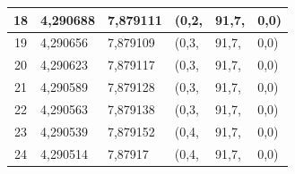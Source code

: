\begin{table}[!htb]
\begin{tabular}{|c|l|l|l|l|l|}
18                             & {\color[HTML]{000000} 4,290688}                                                                             & {\color[HTML]{000000} 7,879111}                                                                              & {\color[HTML]{000000} (0,2,}    & {\color[HTML]{000000} 91,7,}    & {\color[HTML]{000000} 0,0)}     \\ \hline
19                             & {\color[HTML]{000000} 4,290656}                                                                             & {\color[HTML]{000000} 7,879109}                                                                              & {\color[HTML]{000000} (0,3,}    & {\color[HTML]{000000} 91,7,}    & {\color[HTML]{000000} 0,0)}     \\ \hline
20                             & {\color[HTML]{000000} 4,290623}                                                                             & {\color[HTML]{000000} 7,879117}                                                                              & {\color[HTML]{000000} (0,3,}    & {\color[HTML]{000000} 91,7,}    & {\color[HTML]{000000} 0,0)}     \\ \hline
21                             & {\color[HTML]{000000} 4,290589}                                                                             & {\color[HTML]{000000} 7,879128}                                                                              & {\color[HTML]{000000} (0,3,}    & {\color[HTML]{000000} 91,7,}    & {\color[HTML]{000000} 0,0)}     \\ \hline
22                             & {\color[HTML]{000000} 4,290563}                                                                             & {\color[HTML]{000000} 7,879138}                                                                              & {\color[HTML]{000000} (0,3,}    & {\color[HTML]{000000} 91,7,}    & {\color[HTML]{000000} 0,0)}     \\ \hline
23                             & {\color[HTML]{000000} 4,290539}                                                                             & {\color[HTML]{000000} 7,879152}                                                                              & {\color[HTML]{000000} (0,4,}    & {\color[HTML]{000000} 91,7,}    & {\color[HTML]{000000} 0,0)}     \\ \hline
24                             & {\color[HTML]{000000} 4,290514}                                                                             & {\color[HTML]{000000} 7,87917}                                                                               & {\color[HTML]{000000} (0,4,}    & {\color[HTML]{000000} 91,7,}    & {\color[HTML]{000000} 0,0)}     \\ \hline

\end{tabular}
\end{table}
